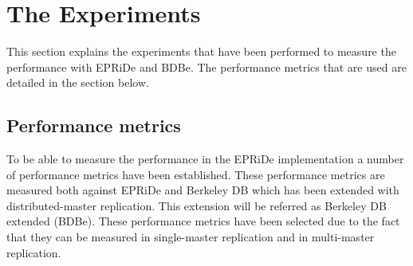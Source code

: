 \section{The Experiments} %
\label{sec:experiments}

This section explains the experiments that have been performed to measure the performance with EPRiDe and BDBe. The performance metrics that are used are detailed in the section below.

\subsection{Performance metrics} %
\label{sub:experiments_performance_metrics}

To be able to measure the performance in the EPRiDe implementation a number of performance metrics have been established. These performance metrics are measured both against EPRiDe and Berkeley DB which has been extended with distributed-master replication. This extension will be referred as Berkeley DB extended (BDBe). These performance metrics have been selected due to the fact that they can be measured in single-master replication and in multi-master replication.

